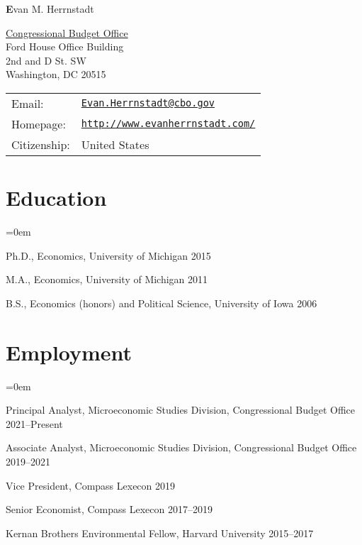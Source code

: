 \documentclass[letterpaper]{article}
\def\name{Evan M. Herrnstadt}
\renewenvironment{itemize}{
  \vspace{-0.5em}
  \begin{list}{}{
	\itemsep=0em
    \setlength{\leftmargin}{1.5em}
  }
}{
  \end{list}
}
\begin{document}
{\Large \textbf\name}


\vspace{0.25in}

\begin{minipage}{0.45\linewidth}
  \href{http://www.cbo.gov/}{Congressional Budget Office} \\
  Ford House Office Building \\
  2nd and D St. SW \\
  Washington, DC 20515
\end{minipage}
\begin{minipage}{0.45\linewidth}
  \begin{tabular}{ll}
    Email: & \href{mailto:Evan.Herrnstadt@cbo.gov}{\tt Evan.Herrnstadt@cbo.gov} \\
    Homepage: & \href{http://www.evanherrnstadt.com/}{\tt http://www.evanherrnstadt.com/} \\
    Citizenship: & United States \\
  \end{tabular}
\end{minipage}


\section*{Education}

\begin{itemize}
  \item Ph.D., Economics, University of Michigan \hfill 2015
  \item M.A., Economics, University of Michigan \hfill 2011
  \item B.S., Economics (honors) and Political Science, University of Iowa \hfill 2006
\end{itemize}


\section*{Employment}
\begin{itemize}
\item Principal Analyst, Microeconomic Studies Division, Congressional Budget Office \hfill 2021--Present
\item Associate Analyst, Microeconomic Studies Division, Congressional Budget Office \hfill 2019--2021
\item Vice President, Compass Lexecon \hfill 2019
\item Senior Economist, Compass Lexecon \hfill  2017--2019
\item Kernan Brothers Environmental Fellow, Harvard University \hfill 2015--2017
\end{itemize}
\end{document}
